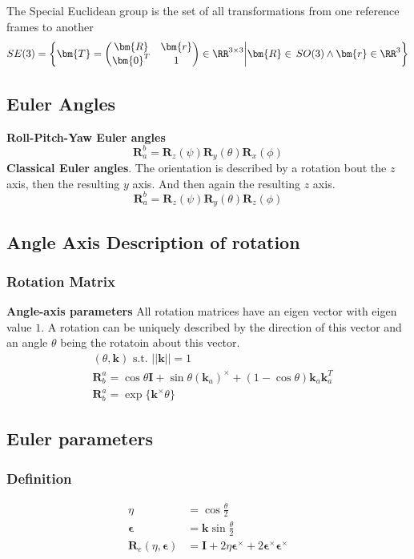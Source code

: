 The Special Euclidean group is the set of all transformations from one reference frames to another
\[
SE(3) = \left\{\bm{T} = \begin{pmatrix}\bm{R} & \bm{r} \\ \bm{0}^T & 1 \end{pmatrix}\in\RR^{3\times3}\middle|\bm{R}\in\,SO(3) \wedge \bm{r}\in\RR^3\right\}
\]

\setcounter{subsection}{4}
\subsection{Euler Angles} %


\textbf{Roll-Pitch-Yaw Euler angles}
\[\bm{R}_a^b = \bm{R}_z(\psi)\bm{R}_y(\theta)\bm{R}_x(\phi)\]
\textbf{Classical Euler angles}. The orientation is described by a rotation bout the \(z\) axis, then the resulting \(y\) axis. And then again the resulting \(z\) axis.
\[\bm{R}_a^b = \bm{R}_z(\psi)\bm{R}_y(\theta)\bm{R}_z(\phi)\]

\subsection{Angle Axis Description of rotation} %
\setcounter{subsubsection}{4}
\subsubsection{Rotation Matrix}

\textbf{Angle-axis parameters} All rotation matrices have an eigen vector with eigen value \(1\). A rotation can be uniquely described by the direction of this vector and an angle \(\theta\) being the rotatoin about this vector.
\begin{align*}
    & (\theta,\bm{k})\text{ s.t. }||\bm{k}|| = 1 \\
    & \bm{R}_b^a = \cos\theta\bm{I} + \sin\theta(\bm{k}_a)^\times + (1-\cos\theta)\bm{k}_a\bm{k}_a^T \\
    & \bm{R}_b^a = \exp\{\bm{k}^\times\theta\}
\end{align*}

\subsection{Euler parameters} %
\subsubsection{Definition}
\begin{align*}
    \eta &= \cos\frac{\theta}{2} \\
    \bm{\epsilon} &= \bm{k}\sin\frac{\theta}{2} \\
    \bm{R}_e(\eta,\bm{\epsilon}) &= \bm{I} + 2\eta\bm{\epsilon}^\times + 2\bm{\epsilon}^\times\bm{\epsilon}^\times
\end{align*}

